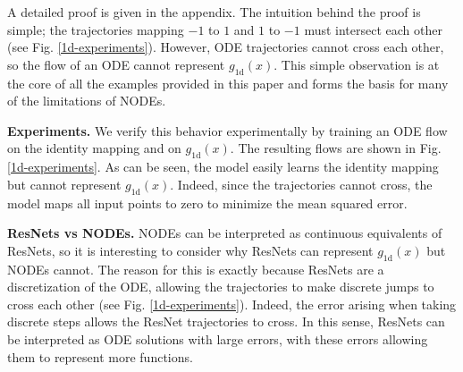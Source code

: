\documentclass{article}
\begin{document}
A detailed proof is given in the appendix. The intuition behind the proof is simple; the trajectories mapping $-1$ to $1$ and $1$ to $-1$ must intersect each other (see Fig. \ref{1d-experiments}). However, ODE trajectories cannot cross each other, so the flow of an ODE cannot represent $g_{1\text{d}}(x)$. This simple observation is at the core of all the examples provided in this paper and forms the basis for many of the limitations of NODEs.

\textbf{Experiments.} We verify this behavior experimentally by training an ODE flow on the identity mapping and on $g_{1\text{d}}(x)$. The resulting flows are shown in Fig. \ref{1d-experiments}. As can be seen, the model easily learns the identity mapping but cannot represent $g_{1\text{d}}(x)$. Indeed, since the trajectories cannot cross, the model maps all input points to zero to minimize the mean squared error.

\textbf{ResNets vs NODEs.} NODEs can be interpreted as continuous equivalents of ResNets, so it is interesting to consider why ResNets can represent $g_{1\text{d}}(x)$ but NODEs cannot. The reason for this is exactly because ResNets are a discretization of the ODE, allowing the trajectories to make discrete jumps to cross each other (see Fig. \ref{1d-experiments}). Indeed, the error arising when taking discrete steps allows the ResNet trajectories to cross. In this sense, ResNets can be interpreted as ODE solutions with large errors, with these errors allowing them to represent more functions.
\end{document}
